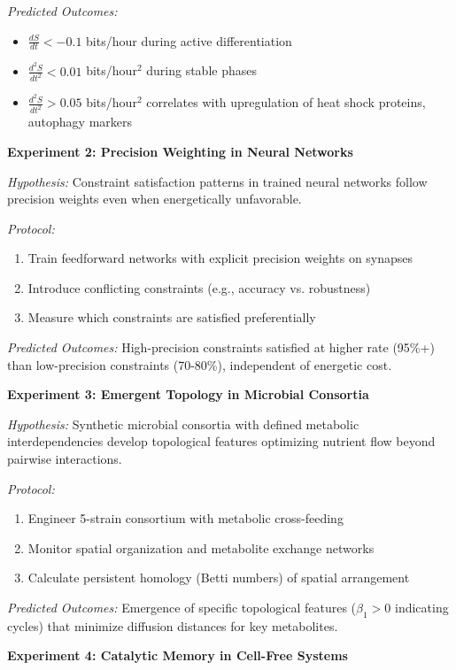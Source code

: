\documentclass[11pt]{article}
\begin{document}
\textit{Predicted Outcomes:}
\begin{itemize}
\item $\frac{dS}{dt} < -0.1$ bits/hour during active differentiation
\item $\frac{d^2S}{dt^2} < 0.01$ bits/hour$^2$ during stable phases
\item $\frac{d^2S}{dt^2} > 0.05$ bits/hour$^2$ correlates with upregulation of heat shock proteins, autophagy markers
\end{itemize}

\textbf{Experiment 2: Precision Weighting in Neural Networks}

\textit{Hypothesis:} Constraint satisfaction patterns in trained neural networks follow precision weights even when energetically unfavorable.

\textit{Protocol:}
\begin{enumerate}
\item Train feedforward networks with explicit precision weights on synapses
\item Introduce conflicting constraints (e.g., accuracy vs. robustness)
\item Measure which constraints are satisfied preferentially
\end{enumerate}

\textit{Predicted Outcomes:}
High-precision constraints satisfied at higher rate (95\%+) than low-precision constraints (70-80\%), independent of energetic cost.

\textbf{Experiment 3: Emergent Topology in Microbial Consortia}

\textit{Hypothesis:} Synthetic microbial consortia with defined metabolic interdependencies develop topological features optimizing nutrient flow beyond pairwise interactions.

\textit{Protocol:}
\begin{enumerate}
\item Engineer 5-strain consortium with metabolic cross-feeding
\item Monitor spatial organization and metabolite exchange networks
\item Calculate persistent homology (Betti numbers) of spatial arrangement
\end{enumerate}

\textit{Predicted Outcomes:}
Emergence of specific topological features ($\beta_1 > 0$ indicating cycles) that minimize diffusion distances for key metabolites.

\textbf{Experiment 4: Catalytic Memory in Cell-Free Systems}
\end{document}
